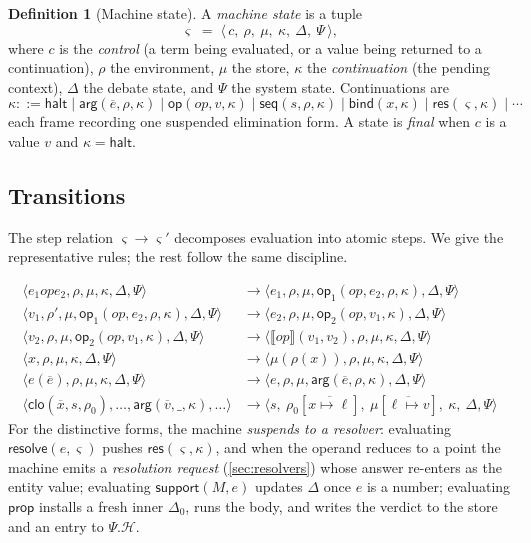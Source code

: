 \documentclass[11pt,a4paper]{article}
\theoremstyle{plain}
\theoremstyle{definition}
\newtheorem{definition}[theorem]{Definition}
\theoremstyle{remark}
\newcommand{\env}{\rho}
\newcommand{\store}{\mu}
\newcommand{\cont}{\kappa}
\newcommand{\dbt}{\Delta}
\newcommand{\sys}{\Psi}
\newcommand{\mstate}{\varsigma}            %
\newcommand{\stepm}{\longrightarrow}       %
\newcommand{\sem}[1]{\llbracket #1 \rrbracket}
\begin{document}
\begin{definition}[Machine state]
\label{def:mstate}
A \emph{machine state} is a tuple
\[
\mstate\;=\;\langle\,c,\ \env,\ \store,\ \cont,\ \dbt,\ \sys\,\rangle,
\]
where $c$ is the \emph{control} (a term being evaluated, or a value being
returned to a continuation), $\env$ the environment, $\store$ the store,
$\cont$ the \emph{continuation} (the pending context), $\dbt$ the debate state,
and $\sys$ the system state. Continuations are
\[
\cont ::= \mathsf{halt}\mid \mathsf{arg}(\overline e,\env,\cont)
\mid \mathsf{op}(op,v,\cont)\mid \mathsf{seq}(s,\env,\cont)
\mid \mathsf{bind}(x,\cont)\mid \mathsf{res}(\varsigma,\cont)\mid\cdots
\]
each frame recording one suspended elimination form. A state is \emph{final}
when $c$ is a value $v$ and $\cont=\mathsf{halt}$.
\end{definition}

\subsection{Transitions}

The step relation $\mstate\stepm\mstate'$ decomposes evaluation into atomic
steps. We give the representative rules; the rest follow the same discipline.

\begin{align*}
\langle e_1\mathbin{op}e_2,\env,\store,\cont,\dbt,\sys\rangle
  &\stepm \langle e_1,\env,\store,\mathsf{op}_1(op,e_2,\env,\cont),\dbt,\sys
  \rangle\\
\langle v_1,\env',\store,\mathsf{op}_1(op,e_2,\env,\cont),\dbt,\sys\rangle
  &\stepm \langle e_2,\env,\store,\mathsf{op}_2(op,v_1,\cont),\dbt,\sys\rangle\\
\langle v_2,\env,\store,\mathsf{op}_2(op,v_1,\cont),\dbt,\sys\rangle
  &\stepm \langle\sem{op}(v_1,v_2),\env,\store,\cont,\dbt,\sys\rangle\\[4pt]
\langle x,\env,\store,\cont,\dbt,\sys\rangle
  &\stepm \langle\store(\env(x)),\env,\store,\cont,\dbt,\sys\rangle\\[4pt]
\langle e(\overline e),\env,\store,\cont,\dbt,\sys\rangle
  &\stepm \langle e,\env,\store,\mathsf{arg}(\overline e,\env,\cont),\dbt,\sys
  \rangle\\
\langle\mathsf{clo}(\overline x,s,\env_0),\ldots,\mathsf{arg}(\overline v,
  \_,\cont),\ldots\rangle
  &\stepm \langle s,\ \env_0[\overline{x\mapsto\ell}],\ \store[\overline{\ell
  \mapsto v}],\ \cont,\ \dbt,\sys\rangle
\end{align*}
For the distinctive forms, the machine \emph{suspends to a resolver}: evaluating
$\mathsf{resolve}(e,\varsigma)$ pushes $\mathsf{res}(\varsigma,\cont)$, and when
the operand reduces to a point the machine emits a \emph{resolution request}
(\cref{sec:resolvers}) whose answer re-enters as the entity value; evaluating
$\mathsf{support}(M,e)$ updates $\dbt$ once $e$ is a number; evaluating
$\mathsf{prop}$ installs a fresh inner $\dbt_0$, runs the body, and writes the
verdict to the store and an entry to $\sys.\mathcal H$.
\end{document}
